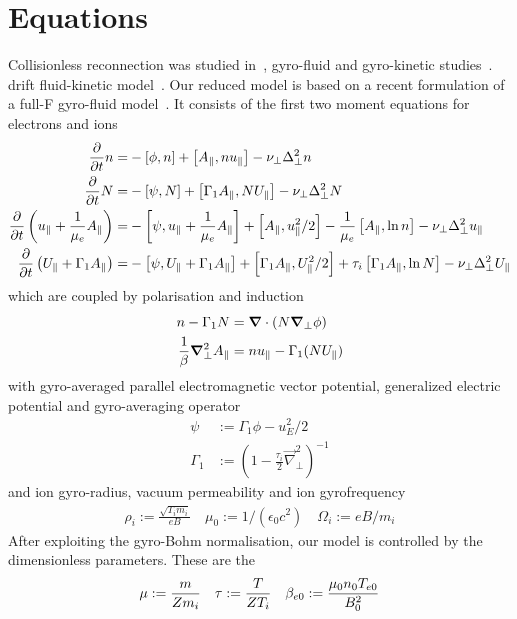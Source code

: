 \section{Equations}
Collisionless reconnection was studied in~\cite{stanier15}, gyro-fluid and gyro-kinetic studies~\cite{comisso13,zacharias14}. drift fluid-kinetic model~\cite{loureiro13}.
Our reduced model is based on a recent formulation of a full-F gyro-fluid model~\cite{Madsen2013}.
It consists of the first two moment equations for electrons and ions
\begin{align}
\frac{\partial}{\partial t} \ne =&
 - \left[\phi, \ne\right]
+ \left[\Apar,\ne \ue  \right]
-\nu_\perp \Delta_\perp^2\ne
\\
\label{firstgyromom}
\frac{\partial}{\partial t} \Ni =&
 - \left[\psi, \Ni\right]
+ \left[\Gamma_1 \Apar ,\Ni \Ui  \right]
-\nu_\perp \Delta_\perp^2\Ni
 \\
\frac{\partial}{\partial t} \left( \ue+ \frac{1}{\mu_e} \Apar \right) =&
      -  \left[ \psi, \ue+ \frac{1}{\mu_e} \Apar  \right]%
    +   \left[\Apar,\ue^2/2   \right]%
      - \frac{1}{\mu_e}  \left[\Apar,\ln{\ne}   \right]
    -\nu_\perp \Delta_\perp^2\ue
      \\
      \frac{\partial}{\partial t} \left( \Ui+ \Gamma_1 \Apar  \right) =&
      -  \left[ \psi, \Ui+ \Gamma_1 \Apar  \right]%
     +   \left[\Gamma_1 \Apar,\Ui^2/2   \right]%
      + \tau_i  \left[\Gamma_1 \Apar,\ln{\Ni}   \right]
    -\nu_\perp \Delta_\perp^2\Ui
\end{align}
which are coupled by polarisation and induction
\begin{align}
 n  - \Gamma_1 N &= {\boldsymbol{\nabla}}\cdot\left(N {\boldsymbol{\nabla}}_\perp \phi\right) \\
 \frac{1}{\beta} {\boldsymbol{\nabla}}_\perp^2 A_\parallel &=  n  u_\parallel - \Gamma_1 (N U_\parallel)
\end{align}
with gyro-averaged parallel electromagnetic vector potential, generalized electric potential and gyro-averaging operator
\begin{align}
 \psi &:= \Gamma_1 \phi - u_E^2 /2  \\
  \Gamma_1 &:= (1-\frac{\tau_i}{2} \vec{\nabla}_\perp^2 )^{-1}
\end{align}
and ion gyro-radius, vacuum permeability and ion gyrofrequency
\begin{align}
  \rho_{i}   := \frac{\sqrt{T_{i} m_i}}{e B} \quad
  \mu_0 := 1/(\epsilon_0 c^2) \quad
  \Omega_i := e B / m_i
\end{align}
After exploiting the gyro-Bohm normalisation, our model is controlled by the dimensionless parameters. These
are the
\begin{align}
 \mu   :=  \frac{m}{Z m_i} \quad
 \tau  :=  \frac{T}{ Z T_i}\quad
 \beta_{e0} :=  \frac{\mu_0 n_0 T_{e0} }{ B_0^2 }
\end{align}

